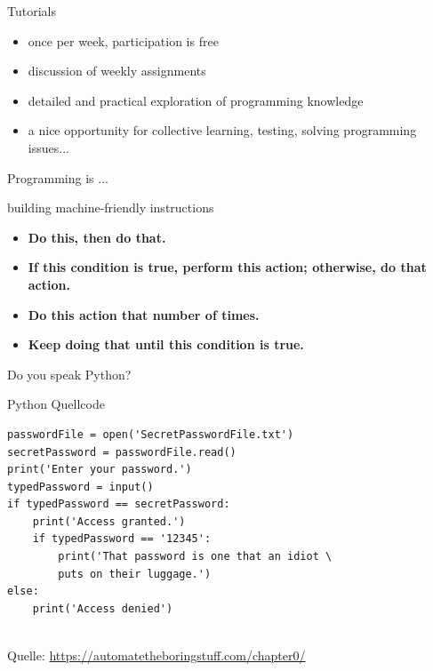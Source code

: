 \documentclass[notes=hide]{beamer}
\begin{document}
\begin{frame}{Tutorials}
  \begin{itemize}
    \item once per week, participation is free
    \item discussion of weekly assignments
    \item detailed and practical exploration of programming knowledge
    \item a nice opportunity for collective learning, testing, solving programming issues...
  \end{itemize}
\end{frame}

\begin{frame}{Programming is ...}

\pause

building machine-friendly instructions

\pause

 \begin{block}{}
  \begin{itemize}
   \item {\bf Do this, then do that.}
   \item {\bf If this condition is true, perform this action; otherwise, do that action.}
   \item  {\bf  Do this action that number of times.}
   \item {\bf Keep doing that until this condition is true.}
    \end{itemize}
 \end{block}
\end{frame}

\begin{frame}[fragile]{Do you speak Python?}

 \begin{block}{Python Quellcode}

\begin{verbatim}
passwordFile = open('SecretPasswordFile.txt')
secretPassword = passwordFile.read()
print('Enter your password.')
typedPassword = input()
if typedPassword == secretPassword:
    print('Access granted.')
    if typedPassword == '12345':
        print('That password is one that an idiot \ 
        puts on their luggage.')
else:
    print('Access denied')
        
\end{verbatim}
 \end{block}

        
Quelle: \url{https://automatetheboringstuff.com/chapter0/}
\end{frame}
\end{document}
